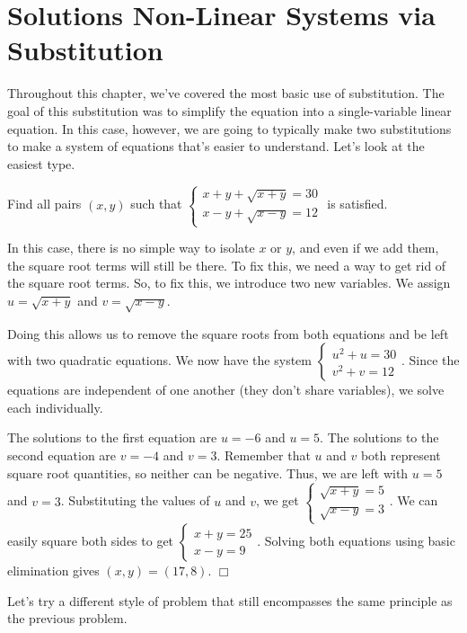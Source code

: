 \documentclass[lang=en,11pt]{elegantbook}
\begin{document}
\section{Solutions Non-Linear Systems via Substitution}
\noindent Throughout this chapter, we've covered the most basic use of substitution.  The goal of this substitution was to simplify the equation into a single-variable linear equation.  In this case, however, we are going to typically make two substitutions to make a system of equations that's easier to understand.  Let's look at the easiest type.
\begin{example}
Find all pairs $(x,y)$ such that $\begin{cases} x+y+\sqrt{x+y}=30 \\ x-y+\sqrt{x-y}=12 \end{cases}$ is satisfied.
\end{example}
\begin{solution}
In this case, there is no simple way to isolate $x$ or $y$, and even if we add them, the square root terms will still be there.  To fix this, we need a way to get rid of the square root terms.  So, to fix this, we introduce two new variables.  We assign $u=\sqrt{x+y}$ and $v=\sqrt{x-y}$.

Doing this allows us to remove the square roots from both equations and be left with two quadratic equations.  We now have the system $\begin{cases} u^2+u=30 \\ v^2+v=12 \end{cases}$.  Since the equations are independent of one another (they don't share variables), we solve each individually.

The solutions to the first equation are $u=-6$ and $u=5$.  The solutions to the second equation are $v=-4$ and $v=3$.  Remember that $u$ and $v$ both represent square root quantities, so neither can be negative.  Thus, we are left with $u=5$ and $v=3$.  Substituting the values of $u$ and $v$, we get $\begin{cases} \sqrt{x+y}=5 \\ \sqrt{x-y}=3 \end{cases}$.  We can easily square both sides to get $\begin{cases} x+y=25 \\ x-y=9 \end{cases}$.  Solving both equations using basic elimination gives $(x,y)=(17,8)$.  $\Box$
\end{solution}
Let's try a different style of problem that still encompasses the same principle as the previous problem.
\end{document}
